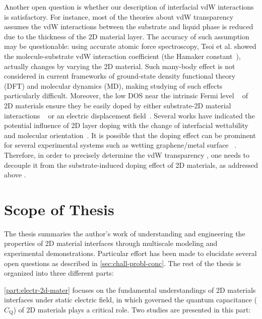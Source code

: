 Another open question is whether our description of interfacial vdW
interactions is satisfactory. For instance, most of the theories
about vdW
transparency~\autocite{Shih_2012_prl,Kim_2015_wetting_controversy} assumes
the vdW interactions between the substrate and liquid phase is reduced
due to the thickness of the 2D material layer.
%
The accuracy of such assumption may be questionable: using accurate atomic
force spectroscopy, Tsoi et al. showed the molecule-substrate vdW
interaction coefficient (the Hamaker
constant~\autocite{parsegian_van_2010_book}), actually changes by varying the
2D material\autocite{Tsoi_2014_vdW_screening_2D}.
%
Such many-body effect is not considered in current frameworks of
ground-state density functional theory (DFT) and molecular dynamics
(MD), making studying of such effects particularly difficult.
%
Moreover, the low DOS near the intrinsic Fermi level
~\autocite{Das_Sarma_2011_electron_gr,Bhimanapati_2015_2D_rev} of 2D
materials ensure they be easily doped by either substrate-2D material
interactions
~\autocite{Varchon_2007_elec_struc_gr_SiC,Giovannetti_2008_doping,Chen_2013_doping}
or an electric displacement
field~\autocite{Das_2008_doping,Perera_2013_doping}.
%
Several works have indicated the potential influence of 2D layer
doping with the change of interfacial wettability and molecular
orientation~\autocite{Huttmann_2015_vdw_gr_doping,Nguyen_2019_PEN}.
%
It is possible that the doping effect can be prominent for several
experimental systems such as wetting
graphene\allowbreak{}/\allowbreak{}metal
surface~\autocite{Giovannetti_2008_doping,Pi_2009_metal_doping_gr} .
%
Therefore, in order to precisely determine the vdW transparency , one
needs to decouple it from the substrate-induced doping effect of 2D
materials, as addressed above
\autocite{Huttmann_2015_vdw_gr_doping,Muruganathan_2015_tunable_vdw_gr,Hong_2016_mechanism,Ashraf_2016_doping}.


\section{Scope of Thesis}
\label{sec:scope-thesis}

The thesis summaries the author's work of understanding and
engineering the properties of 2D material interfaces through
multiscale modeling and experimental demonstrations. Particular effort
has been made to elucidate several open questions as described in
\autoref{sec:chall-probl-conc}. The rest of the thesis is organized
into three different parts:

\autoref{part:electr-2d-mater} focuses on the fundamental
understandings of 2D materials interfaces under static electric field,
in which governed the quantum capacitance ($C_{\mathrm{Q}}$) of 2D
materials plays a critical role.
%
Two studies are
presented in this part:
%

